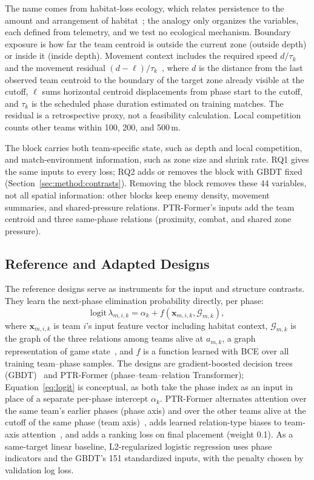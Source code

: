 \documentclass[sigconf,anonymous]{acmart}
\begin{document}
The name comes from habitat-loss ecology, which relates persistence to the amount and arrangement of habitat~\cite{Fahrig03}; the analogy only organizes the variables, each defined from telemetry, and we test no ecological mechanism. Boundary exposure is how far the team centroid is outside the current zone (outside depth) or inside it (inside depth). Movement context includes the required speed $d/\tau_k$ and the movement residual $(d-\ell)/\tau_k$~\cite{Nathan08}, where $d$ is the distance from the last observed team centroid to the boundary of the target zone already visible at the cutoff, $\ell$ sums horizontal centroid displacements from phase start to the cutoff, and $\tau_k$ is the scheduled phase duration estimated on training matches. The residual is a retrospective proxy, not a feasibility calculation. Local competition counts other teams within 100, 200, and 500\,m.

The block carries both team-specific state, such as depth and local competition, and match-environment information, such as zone size and shrink rate. RQ1 gives the same inputs to every loss; RQ2 adds or removes the block with GBDT fixed (Section~\ref{sec:method:contrasts}). Removing the block removes these 44 variables, not all spatial information: other blocks keep enemy density, movement summaries, and shared-pressure relations. PTR-Former's inputs add the team centroid and three same-phase relations (proximity, combat, and shared zone pressure).

\subsection{Reference and Adapted Designs}
\label{sec:method:rq2}
The reference designs serve as instruments for the input and structure contrasts. They learn the next-phase elimination probability directly, per phase:
\begin{equation}
\mathrm{logit}\,\lambda_{m,i,k}=\alpha_k+f(\mathbf{x}_{m,i,k},\mathcal{G}_{m,k}),
\label{eq:logit}
\end{equation}
where $\mathbf{x}_{m,i,k}$ is team $i$'s input feature vector including habitat context, $\mathcal{G}_{m,k}$ is the graph of the three relations among teams alive at $a_{m,k}$, a graph representation of game state~\cite{Xenopoulos21}, and $f$ is a function learned with BCE over all training team--phase samples. The designs are gradient-boosted decision trees (GBDT)~\cite{Friedman01} and PTR-Former (phase--team--relation Transformer); Equation~\eqref{eq:logit} is conceptual, as both take the phase index as an input in place of a separate per-phase intercept $\alpha_k$. PTR-Former alternates attention over the same team's earlier phases (phase axis) and over the other teams alive at the cutoff of the same phase (team axis)~\cite{Vaswani17,Ngiam22}, adds learned relation-type biases to team-axis attention~\cite{Ying21}, and adds a ranking loss on final placement (weight 0.1). As a same-target linear baseline, L2-regularized logistic regression uses phase indicators and the GBDT's 151 standardized inputs, with the penalty chosen by validation log loss.
\end{document}
